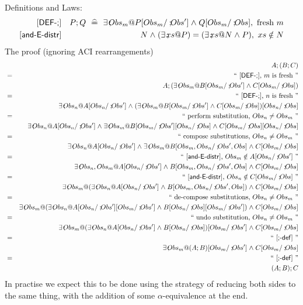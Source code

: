 Definitions and Laws:
\begin{eqnarray*}
  \elabel{DEF-;} &&
   P;Q
   \defs
   \exists \qsep Obs_m @ P[Obs_m/\qsep Obs'] \land Q[Obs_m/\qsep Obs], \mbox{ fresh }m
\\ \elabel{and-E-distr} &&
   N \land (\exists  \qsep xs @ P)
   =
   (\exists \qsep xs @ N \land P), ~xs \notin N
\end{eqnarray*}
The proof (ignoring ACI rearrangements)
\begin{eqnarray*}
  && A ; ( B ; C )
\EQ{\ecite{DEF-;}, $m$ is fresh}
\\&& A ; (\exists \qsep Obs_m @ B[Obs_m/\qsep Obs'] \land C[Obs_m/\qsep Obs])
\EQ{\ecite{DEF-;}, $n$ is fresh}
\\&& \exists \qsep Obs_n @ A[Obs_n/\qsep Obs']
     \land (\exists \qsep Obs_m @ B[Obs_m/\qsep Obs'] \land C[Obs_m/\qsep Obs])[Obs_n/\qsep Obs]
\EQ{perform substitution, $Obs_n \neq Obs_m$}
\\&& \exists \qsep Obs_n @ A[Obs_n/\qsep Obs']
     \land \exists \qsep Obs_m @ B[Obs_m/\qsep Obs'][Obs_n/\qsep Obs] \land C[Obs_m/\qsep Obs][Obs_n/\qsep Obs]
\EQ{compose substitutions, $Obs_n \neq Obs_m$}
\\&& \exists \qsep Obs_n @ A[Obs_n/\qsep Obs']
     \land \exists \qsep Obs_m @ B[Obs_m,Obs_n/\qsep Obs',Obs] \land C[Obs_m/\qsep Obs]
\EQ{\ecite{and-E-distr}, $Obs_m \notin A[Obs_n/\qsep Obs']$}
\\&& \exists \qsep Obs_n,Obs_m @ A[Obs_n/\qsep Obs']
     \land B[Obs_m,Obs_n/\qsep Obs',Obs] \land C[Obs_m/\qsep Obs]
\EQ{\ecite{and-E-distr}, $Obs_n \notin C[Obs_m/\qsep Obs]$}
\\&& \exists \qsep Obs_m @
       (\exists \qsep Obs_n @ A[Obs_n/\qsep Obs'] \land B[Obs_m,Obs_n/\qsep Obs',Obs])
        \land C[Obs_m/\qsep Obs]
\EQ{de-compose substitutions, $Obs_n \neq Obs_m$}
\\&& \exists \qsep Obs_m @
       (\exists \qsep Obs_n @ A[Obs_n/\qsep Obs'][Obs_m/\qsep Obs']
           \land B[Obs_n/\qsep Obs][Obs_m/\qsep Obs'])
        \land C[Obs_m/\qsep Obs]
\EQ{undo substitution, $Obs_n \neq Obs_m$}
\\&& \exists \qsep Obs_m @
       (\exists \qsep Obs_n @ A[Obs_n/\qsep Obs']
           \land B[Obs_n/\qsep Obs])[Obs_m/\qsep Obs']
        \land C[Obs_m/\qsep Obs]
\EQ{\ecite{;-def}}
\\&& \exists \qsep Obs_m @ (A ; B )[Obs_m/\qsep Obs'] \land C[Obs_m/\qsep Obs]
\EQ{\ecite{;-def}}
\\&& (A ; B ) ; C
\end{eqnarray*}
In practise we expect this to be done using the strategy of reducing
both sides to the same thing, with the addition of
some $\alpha$-equivalence at the end.

